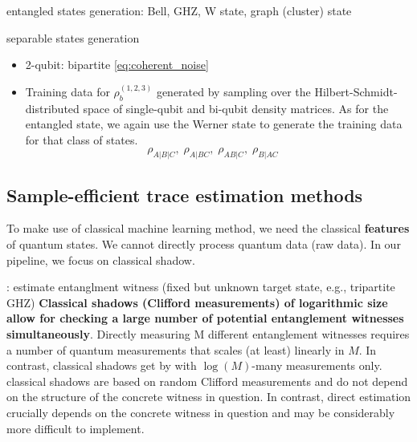 \documentclass[
reprint,
aps,
pra,
floatfix,
]{revtex4-2}
\theoremstyle{plain}
\theoremstyle{definition}
\newcommand{\dm}{\rho}
\begin{document}
entangled states generation: Bell, GHZ, W state, graph (cluster) state

separable states generation
\begin{itemize}
	\item 2-qubit: bipartite \cref{eq:coherent_noise}
	\item Training data for $\dm_b^{(1,2,3)}$ generated by sampling over the Hilbert-Schmidt-distributed space of single-qubit and bi-qubit density matrices. As for the entangled state, we again use the Werner state to generate the training data for that class of states.
	\begin{equation}
		\dm_{A|B|C},\;
		\dm_{A|BC},\;
		\dm_{AB|C},\;
		\dm_{B|AC}
		\quad
	\end{equation}
\end{itemize}

\subsection{Sample-efficient trace estimation methods}
To make use of classical machine learning method, we need the classical \textbf{features} of quantum states.
We cannot directly process quantum data (raw data).
In our pipeline, we focus on classical shadow.

 \cite{huangPredictingManyProperties2020}: estimate entanglment witness (fixed but unknown target state, e.g., tripartite GHZ)
\textbf{Classical shadows (Clifford measurements) of logarithmic size allow for checking a large number of potential entanglement witnesses simultaneously}.
Directly measuring M diﬀerent entanglement witnesses requires a number of quantum measurements that scales (at least) linearly in $M$. In contrast, classical shadows get by with $\log(M)$-many measurements only.
classical shadows are based on random Clifford measurements and do not depend on the structure of the concrete witness in question. In contrast, direct estimation crucially depends on the concrete witness in question and may be considerably more difficult to implement.
\end{document}
